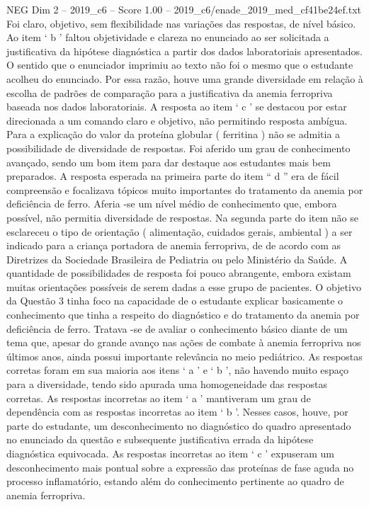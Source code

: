 \begin{textsample}{NEG Dim 2 – 2019\_c6 – Score 1.00 – 2019\_c6/enade\_2019\_med\_cf41be24ef.txt}
Foi claro, objetivo, sem flexibilidade nas variações das respostas, de nível básico.
Ao item ‘ b ’ faltou objetividade e clareza no enunciado ao ser solicitada a justificativa da hipótese diagnóstica a partir dos dados laboratoriais apresentados.
O sentido que o enunciador imprimiu ao texto não foi o mesmo que o estudante acolheu do enunciado.
Por essa razão, houve uma grande diversidade em relação à escolha de padrões de comparação para a justificativa da anemia ferropriva baseada nos dados laboratoriais.
A resposta ao item ‘ c ’ se destacou por estar direcionada a um comando claro e objetivo, não permitindo resposta ambígua.
Para a explicação do valor da proteína globular ( ferritina ) não se admitia a possibilidade de diversidade de respostas.
Foi aferido um grau de conhecimento avançado, sendo um bom item para dar destaque aos estudantes mais bem preparados.
A resposta esperada na primeira parte do item “ d ” era de fácil compreensão e focalizava tópicos muito importantes do tratamento da anemia por deficiência de ferro.
Aferia -se um nível médio de conhecimento que, embora possível, não permitia diversidade de respostas.
Na segunda parte do item não se esclareceu o tipo de orientação ( alimentação, cuidados gerais, ambiental ) a ser indicado para a criança portadora de anemia ferropriva, de de acordo com as Diretrizes da Sociedade Brasileira de Pediatria ou pelo Ministério da Saúde.
A quantidade de possibilidades de resposta foi pouco abrangente, embora existam muitas orientações possíveis de serem dadas a esse grupo de pacientes.
O objetivo da Questão 3 tinha foco na capacidade de o estudante explicar basicamente o conhecimento que tinha a respeito do diagnóstico e do tratamento da anemia por deficiência de ferro.
Tratava -se de avaliar o conhecimento básico diante de um tema que, apesar do grande avanço nas ações de combate à anemia ferropriva nos últimos anos, ainda possui importante relevância no meio pediátrico.
As respostas corretas foram em sua maioria aos itens ‘ a ’ e ‘ b ’, não havendo muito espaço para a diversidade, tendo sido apurada uma homogeneidade das respostas corretas.
As respostas incorretas ao item ‘ a ’ mantiveram um grau de dependência com as respostas incorretas ao item ‘ b ’.
Nesses casos, houve, por parte do estudante, um desconhecimento no diagnóstico do quadro apresentado no enunciado da questão e subsequente justificativa errada da hipótese diagnóstica equivocada.
As respostas incorretas ao item ‘ c ’ expuseram um desconhecimento mais pontual sobre a expressão das proteínas de fase aguda no processo inflamatório, estando além do conhecimento pertinente ao quadro de anemia ferropriva.

\end{textsample}
